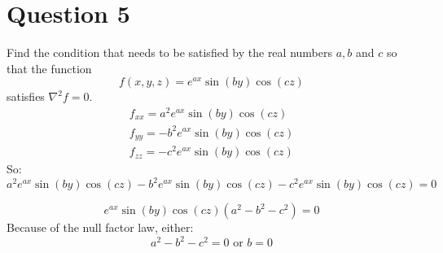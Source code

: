 \documentclass[12pt]{article}
\begin{document}
\section*{Question 5}
Find the condition that needs to be satisfied by the real numbers $a, b$ and $c$ so that the function\\
$$
f(x,y,z)=e^{a x}\sin(b y)\cos(c z)
$$
satisfies $\nabla^2f=0$.
\begin{align*}
	f_{xx}=a^2e^{a x}\sin(b y)\cos(c z) \\
	f_{yy}=-b^2e^{a x}\sin(b y)\cos(c z) \\
	f_{zz}=-c^2e^{a x}\sin(b y)\cos(c z)
\end{align*}
So:
$$
	a^2e^{a x}\sin(b y)\cos(c z)-b^2e^{a x}\sin(b y)\cos(c z)-c^2e^{a x}\sin(b y)\cos(c z)=0
$$

$$
	e^{a x}\sin(b y)\cos(c z)(a^2-b^2-c^2)=0
$$
Because of the null factor law, either:
$$
	a^2-b^2-c^2=0 \text{ or } b = 0
$$
\end{document}
